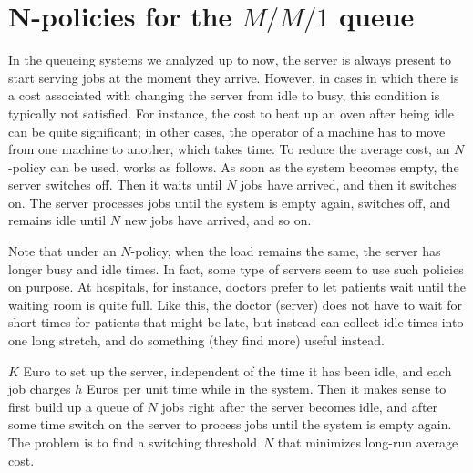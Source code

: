 


\section{N-policies for the $M/M/1$ queue}
\label{sec:n-policies}



In the queueing systems we analyzed up to now, the server is always present to start serving jobs at the moment they arrive.
However, in cases in which there is a cost associated with changing the server from idle to busy, this condition is typically not satisfied.
For instance, the cost to heat up an oven after being idle can be quite significant; in other cases, the operator of a machine has to move from one machine to another, which takes time.
To reduce the average cost, an $N$-policy can be used, works as follows.
As soon as the system becomes empty, the server switches off.
Then it waits until $N$ jobs have arrived, and then it switches on.
The server processes jobs until the system is empty again, switches off, and remains idle until $N$ new jobs have arrived, and so on.

Note that under an $N$-policy, when the load remains the same, the server has longer busy and idle times. 
In fact, some type of servers seem to use such policies on purpose.
At hospitals, for instance, doctors prefer to let patients wait until the waiting room is quite full.
Like this, the doctor (server) does not have to wait for short times for patients that might be late, but instead can collect idle times into one long stretch, and do something (they find more) useful instead.

 $K$ Euro to set up the server, independent of the time it has been idle, and each job charges $h$ Euros per unit time while in the system.
Then it makes sense to first build up a queue of $N$ jobs right after the server becomes idle,
and after some time switch on the server to process jobs until the system is empty again.
The problem is to find a switching threshold~$N$ that minimizes long-run average cost.


